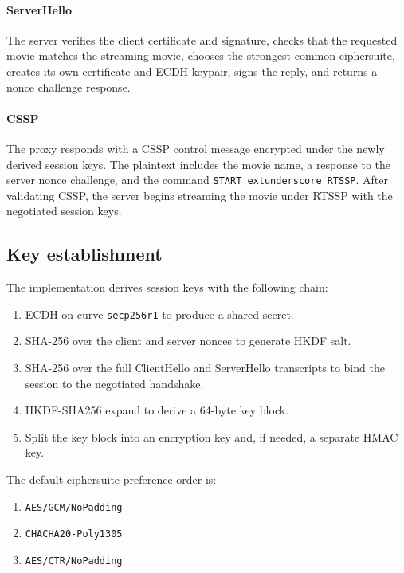 \documentclass[11pt,a4paper]{article}
\begin{document}
\paragraph{ServerHello}
The server verifies the client certificate and signature, checks that the requested movie matches the streaming movie, chooses the strongest common ciphersuite, creates its own certificate and ECDH keypair, signs the reply, and returns a nonce challenge response.

\paragraph{CSSP}
The proxy responds with a CSSP control message encrypted under the newly derived session keys. The plaintext includes the movie name, a response to the server nonce challenge, and the command \texttt{START	extunderscore RTSSP}. After validating CSSP, the server begins streaming the movie under RTSSP with the negotiated session keys.

\subsection{Key establishment}
The implementation derives session keys with the following chain:
\begin{enumerate}[leftmargin=1.2em]
  \item ECDH on curve \texttt{secp256r1} to produce a shared secret.
  \item SHA-256 over the client and server nonces to generate HKDF salt.
  \item SHA-256 over the full ClientHello and ServerHello transcripts to bind the session to the negotiated handshake.
  \item HKDF-SHA256 expand to derive a 64-byte key block.
  \item Split the key block into an encryption key and, if needed, a separate HMAC key.
\end{enumerate}

The default ciphersuite preference order is:
\begin{enumerate}[leftmargin=1.2em]
  \item \texttt{AES/GCM/NoPadding}
  \item \texttt{CHACHA20-Poly1305}
  \item \texttt{AES/CTR/NoPadding}
\end{enumerate}
\end{document}
